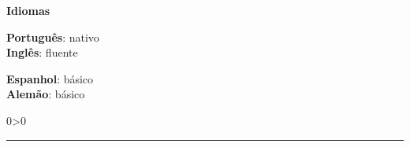 \documentclass[a4paper,10pt]{article}
\newcommand{\criaSecao}[4][0]{
    \noindent
	\begin{minipage}{0.16\linewidth}
		\large{\textbf{#2}}
		\vspace{#3\baselineskip}
	\end{minipage}
	\hfill
	\begin{minipage}{0.79\linewidth}
		#4
		\ifnum0#1>0 { \hrule {\ } } \fi
	\end{minipage}
	\vspace{\baselineskip}
}
\begin{document}
	\criaSecao{Idiomas}{2}{
	    \large{
			\begin{minipage}{0.5\linewidth}
				\textbf{Português}: nativo \\
				\textbf{Inglês}: fluente \\
			\end{minipage}
			\begin{minipage}{0.5\linewidth}
				\textbf{Espanhol}: básico \\
				\textbf{Alemão}: básico \\
			\end{minipage}
		}
	}
    \label{ultimaPagina}
\end{document}
